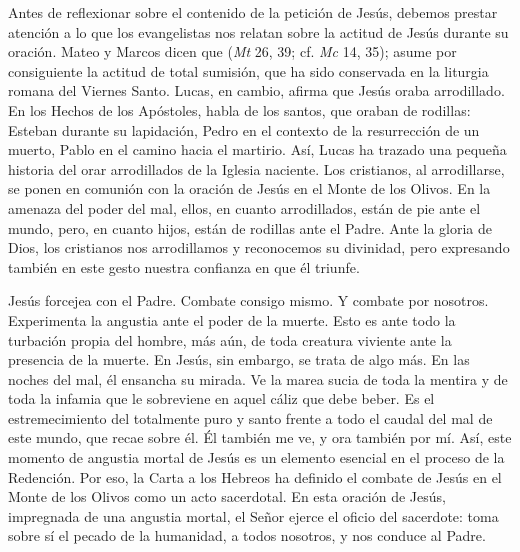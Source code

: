 \begin{body}
Antes de reflexionar sobre el contenido de la petición de Jesús, debemos prestar atención a lo que los evangelistas nos relatan sobre la actitud de Jesús durante su oración. Mateo y Marcos dicen que  (\textit{Mt} 26, 39; cf. \textit{Mc} 14, 35); asume por consiguiente la actitud de total sumisión, que ha sido conservada en la liturgia romana del Viernes Santo. Lucas, en cambio, afirma que Jesús oraba arrodillado. En los Hechos de los Apóstoles, habla de los santos, que oraban de rodillas: Esteban durante su lapidación, Pedro en el contexto de la resurrección de un muerto, Pablo en el camino hacia el martirio. Así, Lucas ha trazado una pequeña historia del orar arrodillados de la Iglesia naciente. Los cristianos, al arrodillarse, se ponen en comunión con la oración de Jesús en el Monte de los Olivos. En la amenaza del poder del mal, ellos, en cuanto arrodillados, están de pie ante el mundo, pero, en cuanto hijos, están de rodillas ante el Padre. Ante la gloria de Dios, los cristianos nos arrodillamos y reconocemos su divinidad, pero expresando también en este gesto nuestra confianza en que él triunfe.

Jesús forcejea con el Padre. Combate consigo mismo. Y combate por nosotros. Experimenta la angustia ante el poder de la muerte. Esto es ante todo la turbación propia del hombre, más aún, de toda creatura viviente ante la presencia de la muerte. En Jesús, sin embargo, se trata de algo más. En las noches del mal, él ensancha su mirada. Ve la marea sucia de toda la mentira y de toda la infamia que le sobreviene en aquel cáliz que debe beber. Es el estremecimiento del totalmente puro y santo frente a todo el caudal del mal de este mundo, que recae sobre él. Él también me ve, y ora también por mí. Así, este momento de angustia mortal de Jesús es un elemento esencial en el proceso de la Redención. Por eso, la Carta a los Hebreos ha definido el combate de Jesús en el Monte de los Olivos como un acto sacerdotal. En esta oración de Jesús, impregnada de una angustia mortal, el Señor ejerce el oficio del sacerdote: toma sobre sí el pecado de la humanidad, a todos nosotros, y nos conduce al Padre.


\end{body}
